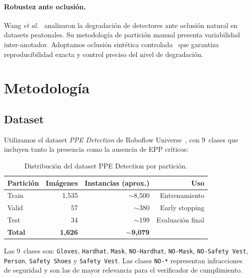 \documentclass{article}
\begin{document}
\paragraph{Robustez ante oclusión.}
Wang \emph{et al.}~\cite{wang2020robust} analizaron la degradación de
detectores ante oclusión natural en datasets peatonales. Su metodología
de partición manual presenta variabilidad inter-anotador. Adoptamos
oclusión sintética controlada~\cite{dwibedi2017cut} que garantiza
reproducibilidad exacta y control preciso del nivel de degradación.

\section{Metodología}
\label{sec:methodology}

\subsection{Dataset}

Utilizamos el dataset \emph{PPE Detection} de Roboflow
Universe~\cite{roboflow2024ppe}, con 9~clases que incluyen tanto
la presencia como la ausencia de EPP críticos:

\begin{table}[h]
  \centering
  \caption{Distribución del dataset PPE Detection por partición.}
  \label{tab:dataset}
  \small
  \begin{tabular}{lrrr}
    \toprule
    \textbf{Partición} & \textbf{Imágenes}
                       & \textbf{Instancias (aprox.)}
                       & \textbf{Uso} \\
    \midrule
    Train    & 1{,}535 & $\sim$8{,}500 & Entrenamiento \\
    Valid    &      57 & $\sim$380     & Early stopping \\
    Test     &      34 & $\sim$199     & Evaluación final \\
    \midrule
    \textbf{Total} & \textbf{1{,}626} & $\sim$\textbf{9{,}079} & \\
    \bottomrule
  \end{tabular}
\end{table}

Las 9~clases son: \texttt{Gloves}, \texttt{Hardhat}, \texttt{Mask},
\texttt{NO-Hardhat}, \texttt{NO-Mask}, \texttt{NO-Safety Vest},
\texttt{Person}, \texttt{Safety Shoes} y \texttt{Safety Vest}.
Las clases \texttt{NO-*} representan infracciones de seguridad y son
las de mayor relevancia para el verificador de cumplimiento.
\end{document}
